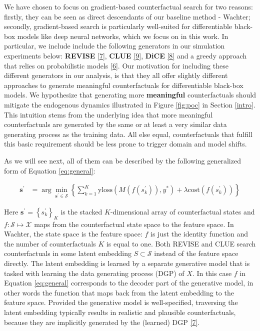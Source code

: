 \documentclass[conference,final,]{IEEEtran}
\begin{document}
We have chosen to focus on gradient-based counterfactual search for two reasons: firstly, they can be seen as direct descendants of our baseline method - Wachter; secondly, gradient-based search is particularly well-suited for differentiable black-box models like deep neural networks, which we focus on in this work. In particular, we include include the following generators in our simulation experiments below: \textbf{REVISE} \protect\hyperlink{ref-joshi2019towards}{{[}7{]}}, \textbf{CLUE} \protect\hyperlink{ref-antoran2020getting}{{[}9{]}}, \textbf{DiCE} \protect\hyperlink{ref-mothilal2020explaining}{{[}8{]}} and a greedy approach that relies on probabilistic models \protect\hyperlink{ref-schut2021generating}{{[}6{]}}. Our motivation for including these different generators in our analysis, is that they all offer slightly different approaches to generate meaningful counterfactuals for differentiable black-box models. We hypothesize that generating more \textbf{meaningful} counterfactuals should mitigate the endogenous dynamics illustrated in Figure \ref{fig:poc} in Section \ref{intro}. This intuition stems from the underlying idea that more meaningful counterfactuals are generated by the same or at least a very similar data generating process as the training data. All else equal, counterfactuals that fulfill this basic requirement should be less prone to trigger domain and model shifts.

As we will see next, all of them can be described by the following generalized form of Equation \eqref{eq:general}:

\begin{equation}
\begin{aligned}
\mathbf{s}^\prime &= \arg \min_{\mathbf{s}^\prime \in \mathcal{S}} \left\{ \sum_{k=1}^{K} {\text{yloss}(M(f(s_k^\prime)),y^*)}+ \lambda {\text{cost}(f(s_k^\prime)) }  \right\} \label{eq:general}
\end{aligned} 
\end{equation}

Here \(\mathbf{s}^\prime=\left\{s_k^\prime\right\}_K\) is the stacked \(K\)-dimensional array of counterfactual states and \(f: \mathcal{S} \mapsto \mathcal{X}\) maps from the counterfactual state space to the feature space. In Wachter, the state space is the feature space: \(f\) is just the identity function and the number of counterfactuals \(K\) is equal to one. Both REVISE and CLUE search counterfactuals in some latent embedding \(S \subset \mathcal{S}\) instead of the feature space directly. The latent embedding is learned by a separate generative model that is tasked with learning the data generating process (DGP) of \(X\). In this case \(f\) in Equation \eqref{eq:general} corresponds to the decoder part of the generative model, in other words the function that maps back from the latent embedding to the feature space. Provided the generative model is well-specified, traversing the latent embedding typically results in realistic and plausible counterfactuals, because they are implicitly generated by the (learned) DGP \protect\hyperlink{ref-joshi2019towards}{{[}7{]}}.
\end{document}
